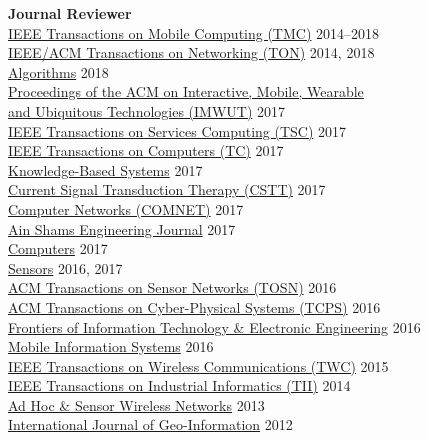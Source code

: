 {\bf Journal Reviewer}\\
{\href{https://www.computer.org/portal/web/tmc}{IEEE Transactions on Mobile Computing (TMC)}} \hfill 2014--2018\\
{\href{http://ieeexplore.ieee.org/xpl/RecentIssue.jsp?punumber=90}{IEEE/ACM Transactions on Networking (TON)}} \hfill 2014, 2018\\
{\href{http://www.mdpi.com/journal/algorithms}{Algorithms}} \hfill 2018\\
{\href{https://imwut.acm.org}{Proceedings of the ACM on Interactive, Mobile, Wearable \\\mbox{\hspace{0.4cm}} and Ubiquitous Technologies (IMWUT)}} \hfill 2017\\
{\href{https://www.computer.org/web/tsc}{IEEE Transactions on Services Computing (TSC)}} \hfill 2017\\
{\href{https://www.computer.org/web/tc}{IEEE Transactions on Computers (TC)}} \hfill 2017\\
{\href{https://www.journals.elsevier.com/knowledge-based-systems}{Knowledge-Based Systems}} \hfill 2017\\
{\href{http://benthamscience.com/journals/current-signal-transduction-therapy/}{Current Signal Transduction Therapy (CSTT)}} \hfill 2017\\
{\href{http://ees.elsevier.com/comnet/}{Computer Networks (COMNET)}} \hfill 2017\\
{\href{https://www.journals.elsevier.com/ain-shams-engineering-journal}{Ain Shams Engineering Journal}} \hfill 2017\\
{\href{http://www.mdpi.com/journal/computers}{Computers}} \hfill 2017\\
{\href{http://www.mdpi.com/journal/sensors}{Sensors}} \hfill 2016, 2017\\
{\href{http://tosn.acm.org/}{ACM Transactions on Sensor Networks (TOSN)}} \hfill 2016\\
{\href{http://tcps.acm.org/}{ACM Transactions on Cyber-Physical Systems (TCPS)}} \hfill 2016\\
{\href{http://www.springer.com/computer/journal/11714}{Frontiers of Information Technology \& Electronic Engineering}} \hfill 2016\\
{\href{https://www.hindawi.com/journals/misy/}{Mobile Information Systems}} \hfill 2016\\
{\href{http://www.comsoc.org/twc}{IEEE Transactions on Wireless Communications (TWC)}} \hfill 2015\\
{\href{http://www.ieee-ies.org/pubs/transactions-on-industrial-informatics}{IEEE Transactions on Industrial Informatics (TII)}} \hfill 2014\\
{\href{http://www.oldcitypublishing.com/AHSWN/AHSWN.html}{Ad Hoc \& Sensor Wireless Networks}} \hfill 2013\\
{\href{http://www.mdpi.com/journal/ijgi}{International Journal of Geo-Information}} \hfill 2012\\
